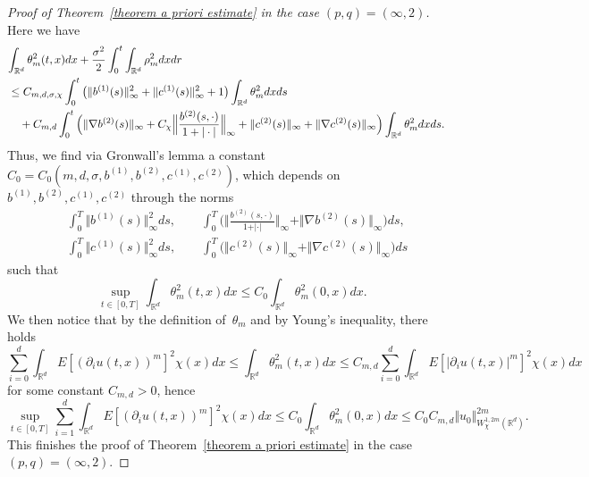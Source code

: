 \documentclass[a4paper,10pt]{article}
\newcommand\1{\mathbbm{1}}
\numberwithin{equation}{section}
\begin{document}
\begin{proof}[Proof of Theorem~\ref{theorem a priori estimate} in the case
$(p,q)=(\infty,2)$] Here we have
\begin{align*}
\lefteqn{ \int_{\mathbb{R}^{d}}\theta_{m}^{2}(t,x)dx+\frac{\sigma^{2}}{2}\int_{0} 
^{t}\int_{\mathbb{R}^{d}}\rho_{m}^{2}dxdr }\\
&  \leq C_{m,d,\sigma,\chi}\int_{0}^{t} \big(\Vert b^{(1)}(s) \Vert_{\infty}^{2}+\Vert c^{(1)}(s)  \Vert_{\infty}^{2} +1 \big)  \int_{\mathbb{R}^{d}}\theta_{m}^{2}dxds\\
& \quad {} +C_{m,d}\int_{0}^{t} \Big( \Vert \nabla b^{(2)}(s) \Vert_{\infty} +C_{\chi} \Big\Vert \frac{b^{(2)}(s,\cdot)}{1+\vert \cdot\vert }\Big\Vert
_{\infty}+ \Vert c^{(2)}(s)  \Vert_{\infty}+ \Vert \nabla c^{(2)}(s) \Vert_{\infty} \Big)  \int_{\mathbb{R}^{d}} \theta_{m}^{2}dxds .
\end{align*}
Thus, we find via Gronwall's lemma a constant $C_{0} 
=C_{0}(m,d,\sigma,b^{(1)  },b^{(2)
},c^{(1)  },c^{(2)  })$, which depends on
$b^{(1)  },b^{(2)  },c^{(1)
},c^{(2)  }$ through the norms 
\begin{align*}
&  \int_{0}^{T} \Vert b^{(1)}(s) \Vert_{\infty}^{2}ds ,\qquad \int_{0}^{T} \Big( \Big\Vert \frac{b^{(2)}(s,\cdot) }{1+\vert \cdot\vert
}\Big\Vert_{\infty}+\Vert \nabla b^{(2)}(s) \Vert_{\infty} \Big)  ds,\\
&  \int_{0}^{T} \Vert c^{(1)}(s)  \Vert_{\infty}^{2} ds , \qquad \int_{0}^{T}\big(\Vert c^{(2)}(s)  \Vert _{\infty}+ \Vert \nabla c^{(2)}(s) \Vert_{\infty} \big)  ds
\end{align*}
such that
\begin{equation}
\sup_{t\in [  0,T]  }\int_{\mathbb{R}^{d}}\theta_{m}^{2}(t,x)dx\leq
C_{0}\int_{\mathbb{R}^{d}}\theta_{m}^{2}(0,x)dx.\label{final bound on theta} 
\end{equation}
We then notice that by the definition of~$\theta_m$ and by Young's inequality, there holds
\begin{equation*}
\sum_{i=0}^{d}\int_{\mathbb{R}^{d}}E[(\partial_{i}u(t,x))
^{m}]^{2}\chi(x)  dx\leq\int_{\mathbb{R}^{d}}\theta
_{m}^{2}(t,x)dx\leq C_{m,d}\sum_{i=0}^{d}\int_{\mathbb{R}^{d}}E[
\vert \partial_{i}u(t,x)\vert ^{m}]^{2}\chi(x)  dx
\end{equation*}
for some constant $C_{m,d}>0$, hence
\begin{equation*}
\sup_{t\in[0,T]} \sum_{i=1}^{d}\int_{\mathbb{R}^{d}}E[(\partial_{i}u(t,x))^{m}]^{2} \chi(x)
dx\leq C_{0}\int_{\mathbb{R}^{d}}\theta_{m}^{2}(0,x)dx\leq C_{0} 
C_{m,d}\Vert u_{0}\Vert_{W_{\chi}^{1,2m}(\mathbb{R}^{d})}^{2m}.
\end{equation*}
This finishes the proof of Theorem~\ref{theorem a priori estimate} in the case $(p,q)=(\infty,2)$.
\end{proof}
\end{document}
